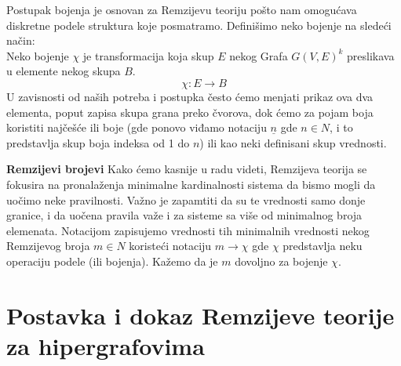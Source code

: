 \documentclass[a4paper]{article}
\begin{document}
\begin{description}
		Postupak bojenja je osnovan za Remzijevu teoriju pošto nam omogućava diskretne podele struktura koje posmatramo. Definišimo neko bojenje na sledeći način: \\
		Neko bojenje $\chi$ je transformacija koja skup $E$ nekog Grafa $G(V,E)^k$ preslikava u elemente nekog skupa $B$.
		\[ 
			\chi : E \rightarrow B
		 \] 
		 U zavisnosti od naših potreba i postupka često ćemo menjati prikaz ova dva elementa, poput zapisa skupa grana preko čvorova, dok ćemo za pojam boja koristiti najčešće ili boje (gde ponovo viđamo notaciju $\underline{n}$ gde $n \in N$, i to predstavlja skup boja indeksa od 1 do $n$) ili kao neki definisani skup vrednosti. %
		\item \textbf{Remzijevi brojevi}
		Kako ćemo kasnije u radu videti, Remzijeva teorija se fokusira na pronalaženja minimalne kardinalnosti sistema da bismo mogli da uočimo neke pravilnosti. Važno je zapamtiti da su te vrednosti samo donje granice, i da uočena pravila važe i za sisteme sa više od minimalnog broja elemenata. Notacijom zapisujemo vrednosti tih minimalnih vrednosti nekog Remzijevog broja $m \in N$ koristeći notaciju $m \rightarrow \chi$ gde $\chi$ predstavlja neku operaciju podele (ili bojenja). Kažemo da je $m$ dovoljno za bojenje $\chi$.
	\end{description}
	
	\section{Postavka i dokaz Remzijeve teorije za hipergrafovima}
\end{document}

